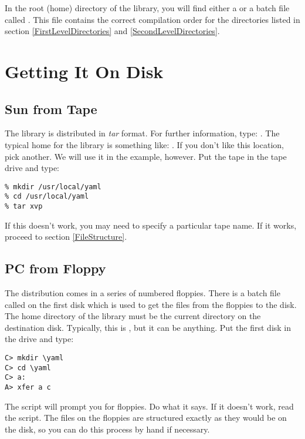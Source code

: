 In the root (home) directory of the library, you will find either
a  or a batch file called .  This file
contains the correct compilation order for the directories listed
in section \ref{FirstLevelDirectories} and \ref{SecondLevelDirectories}.

\section{Getting It On Disk}

\subsection{Sun from Tape}
\label{SunCopy}

The library is distributed in {\em tar} format.  For further information,
type: .  The typical home for the library is
something like: .   If you don't like this
location, pick another.  We will use it in the example, however.
Put the tape in the tape drive and type:

\begin{verbatim}
% mkdir /usr/local/yaml
% cd /usr/local/yaml
% tar xvp
\end{verbatim}

If this doesn't work, you may need to specify a particular tape
 name.  
If it works, proceed to section \ref{FileStructure}.

\subsection{PC from Floppy}
\label{PCCopy}

The distribution comes in a series of numbered floppies.  There is a
batch file called  on the first disk which is used to 
get the files from the floppies to the disk.  The home directory of the
library must be the current directory on the destination disk.  Typically,
this is \code{\\yaml}, but it can be anything.  Put the first disk
in the drive and type:
\begin{verbatim}
C> mkdir \yaml
C> cd \yaml
C> a:
A> xfer a c
\end{verbatim}

The script will prompt you for floppies.  Do what it says.  If it doesn't
work, read the script.  The files on the floppies are structured exactly
as they would be on the disk, so you can do this process by hand if necessary.

